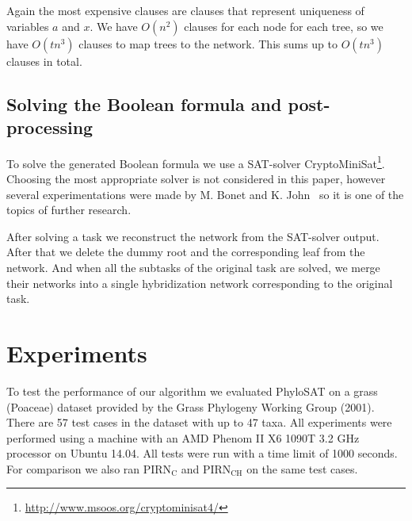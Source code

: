 \documentclass[runningheads, envcountsame, a4paper]{llncs}
\begin{document}
Again the most expensive clauses are clauses that represent uniqueness of variables $a$ and $x$. We have $O(n^2)$ clauses for
each node for each tree, so we have $O(tn^3)$ clauses to map trees to the network. This sums up to $O(tn^3)$ clauses in total.

\subsection{Solving the Boolean formula and post-processing}

To solve the generated Boolean formula we use a SAT-solver CryptoMiniSat\footnote{\url{http://www.msoos.org/cryptominisat4/}}.
Choosing the most appropriate solver is not considered in this paper, however several experimentations were made by 
M. Bonet and K. John~\cite{bonet2009efficiently} so it is one of the topics of further research.

After solving a task we reconstruct the network from the SAT-solver output. After that we delete the dummy root and the corresponding 
leaf from the network. And when all the subtasks of the original task are solved, we merge their networks into a single 
hybridization network corresponding to the original task.

\section{Experiments}

To test the performance of our algorithm we evaluated PhyloSAT on a grass (Poaceae) dataset provided by the Grass Phylogeny Working Group (2001). There are 57 test cases in the dataset with up to 47 taxa. All experiments were performed using a machine with an AMD Phenom II X6 1090T 3.2 GHz 
processor on Ubuntu 14.04. All tests were run with a time limit of 1000 seconds. For comparison we also ran PIRN$\mathrm{_C}$ and PIRN$\mathrm{_{CH}}$ 
on the same test cases. 
\end{document}

